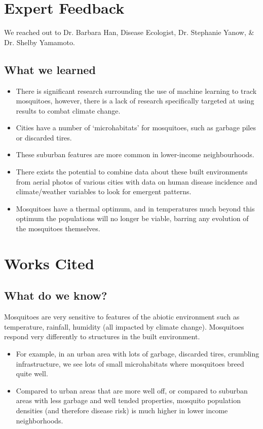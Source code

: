 \documentclass[11pt]{article}
\begin{document}
\section{Expert Feedback}
We reached out to Dr. Barbara Han, Disease Ecologist, Dr. Stephanie Yanow, \& Dr. Shelby Yamamoto.

\subsection{What we learned}
\begin{itemize}
\item There is significant research surrounding the use of machine learning to track mosquitoes, however, there is a lack of research specifically targeted at using results to combat climate change.
\item Cities have a number of ‘microhabitats’ for mosquitoes, such as garbage piles or discarded tires. 
\item These suburban features are more common in lower-income neighbourhoods.
\item There exists the potential to combine data about these built environments from aerial photos of various cities with data on human disease incidence and climate/weather variables to look for emergent patterns.
\item Mosquitoes have a thermal optimum, and in temperatures much beyond this optimum the populations will no longer be viable, barring any evolution of the mosquitoes themselves.
\end{itemize}

\section{Works Cited}
\subsection{What do we know?}
Mosquitoes are very sensitive to features of the abiotic environment such as temperature, rainfall, humidity (all impacted by climate change). Mosquitoes respond very differently to structures in the built environment.
\begin{itemize}
\item For example, in an urban area with lots of garbage, discarded tires, crumbling infrastructure, we see lots of small microhabitats where mosquitoes breed quite well. 
\item Compared to urban areas that are more well off, or compared to suburban areas with less garbage and well tended properties, mosquito population densities (and therefore disease risk) is much higher in lower income neighborhoods. 
\end{itemize}
\end{document}
